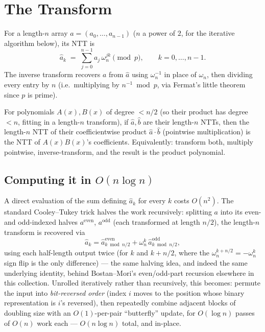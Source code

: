 \documentclass[11pt]{article}
\begin{document}
\section{The Transform}
\begin{definitionbox}
For a length-$n$ array $a = (a_0,\ldots,a_{n-1})$ ($n$ a power of $2$,
for the iterative algorithm below), its NTT is
\[
  \hat a_k \;=\; \sum_{j=0}^{n-1} a_j\, \omega_n^{jk} \pmod p, \qquad
  k = 0,\ldots,n-1.
\]
The inverse transform recovers $a$ from $\hat a$ using $\omega_n^{-1}$
in place of $\omega_n$, then dividing every entry by $n$ (i.e.\
multiplying by $n^{-1} \bmod p$, via Fermat's little theorem since $p$ is
prime).
\end{definitionbox}

\begin{theorembox}
For polynomials $A(x), B(x)$ of degree $< n/2$ (so their product has
degree $< n$, fitting in a length-$n$ transform), if
$\hat a, \hat b$ are their length-$n$ NTTs, then the length-$n$ NTT of
their coefficientwise product $\hat a \cdot \hat b$ (pointwise
multiplication) is the NTT of $A(x)B(x)$'s coefficients. Equivalently:
transform both, multiply pointwise, inverse-transform, and the result is
the product polynomial.
\end{theorembox}

\subsection{Computing it in $O(n \log n)$}
A direct evaluation of the sum defining $\hat a_k$ for every $k$ costs
$O(n^2)$. The standard Cooley--Tukey trick halves the work recursively:
splitting $a$ into its even- and odd-indexed halves $a^{\text{even}}$,
$a^{\text{odd}}$ (each transformed at length $n/2$), the length-$n$
transform is recovered via
\[
  \hat a_k = \hat a^{\text{even}}_{k \bmod n/2}
    + \omega_n^{k}\, \hat a^{\text{odd}}_{k \bmod n/2},
\]
using each half-length output twice (for $k$ and $k+n/2$, where the
$\omega_n^{k+n/2} = -\omega_n^k$ sign flip is the only difference) ---
the same halving idea, and indeed the same underlying identity, behind
Bostan--Mori's even/odd-part recursion elsewhere in this collection.
Unrolled iteratively rather than recursively, this becomes: permute the
input into \emph{bit-reversed order} (index $i$ moves to the position
whose binary representation is $i$'s reversed), then repeatedly combine
adjacent blocks of doubling size with an $O(1)$-per-pair ``butterfly''
update, for $O(\log n)$ passes of $O(n)$ work each --- $O(n \log n)$
total, and in-place.
\end{document}
